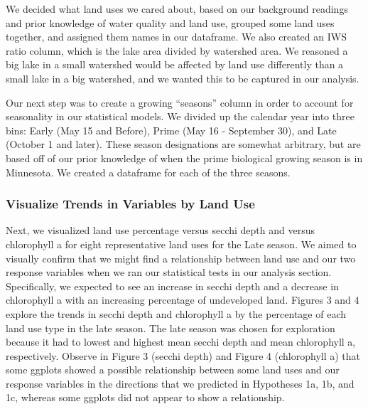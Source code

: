 \documentclass[12pt,]{article}
\begin{document}
We decided what land uses we cared about, based on our background
readings and prior knowledge of water quality and land use, grouped some
land uses together, and assigned them names in our dataframe. We also
created an IWS ratio column, which is the lake area divided by watershed
area. We reasoned a big lake in a small watershed would be affected by
land use differently than a small lake in a big watershed, and we wanted
this to be captured in our analysis.

Our next step was to create a growing ``seasons'' column in order to
account for seasonality in our statistical models. We divided up the
calendar year into three bins: Early (May 15 and Before), Prime (May 16
- September 30), and Late (October 1 and later). These season
designations are somewhat arbitrary, but are based off of our prior
knowledge of when the prime biological growing season is in Minnesota.
We created a dataframe for each of the three seasons.

\hypertarget{visualize-trends-in-variables-by-land-use}{%
\subsubsection{Visualize Trends in Variables by Land
Use}\label{visualize-trends-in-variables-by-land-use}}

Next, we visualized land use percentage versus secchi depth and versus
chlorophyll a for eight representative land uses for the Late season. We
aimed to visually confirm that we might find a relationship between land
use and our two response variables when we ran our statistical tests in
our analysis section. Specifically, we expected to see an increase in
secchi depth and a decrease in chlorophyll a with an increasing
percentage of undeveloped land. Figures 3 and 4 explore the trends in
secchi depth and chlorophyll a by the percentage of each land use type
in the late season. The late season was chosen for exploration because
it had to lowest and highest mean secchi depth and mean chlorophyll a,
respectively. Observe in Figure 3 (secchi depth) and Figure 4
(chlorophyll a) that some ggplots showed a possible relationship between
some land uses and our response variables in the directions that we
predicted in Hypotheses 1a, 1b, and 1c, whereas some ggplots did not
appear to show a relationship.
\end{document}
